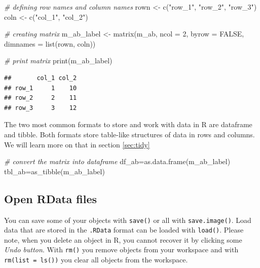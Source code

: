 \documentclass[
  12pt,
  oneside]{book}
\newenvironment{Shaded}{\begin{snugshade}}{\end{snugshade}}
\newcommand{\AttributeTok}[1]{\textcolor[rgb]{0.77,0.63,0.00}{#1}}
\newcommand{\CommentTok}[1]{\textcolor[rgb]{0.56,0.35,0.01}{\textit{#1}}}
\newcommand{\ConstantTok}[1]{\textcolor[rgb]{0.00,0.00,0.00}{#1}}
\newcommand{\DecValTok}[1]{\textcolor[rgb]{0.00,0.00,0.81}{#1}}
\newcommand{\FunctionTok}[1]{\textcolor[rgb]{0.00,0.00,0.00}{#1}}
\newcommand{\NormalTok}[1]{#1}
\newcommand{\OtherTok}[1]{\textcolor[rgb]{0.56,0.35,0.01}{#1}}
\newcommand{\StringTok}[1]{\textcolor[rgb]{0.31,0.60,0.02}{#1}}
\theoremstyle{definition}
\theoremstyle{definition}
\theoremstyle{definition}
\theoremstyle{definition}
\theoremstyle{remark}
\begin{document}
\begin{Shaded}
\begin{Highlighting}[]
\CommentTok{\# defining row names and column names}
\NormalTok{rown }\OtherTok{\textless{}{-}} \FunctionTok{c}\NormalTok{(}\StringTok{"row\_1"}\NormalTok{, }\StringTok{"row\_2"}\NormalTok{, }\StringTok{"row\_3"}\NormalTok{)}
\NormalTok{coln }\OtherTok{\textless{}{-}} \FunctionTok{c}\NormalTok{(}\StringTok{"col\_1"}\NormalTok{, }\StringTok{"col\_2"}\NormalTok{)}

\CommentTok{\# creating matrix}
\NormalTok{m\_ab\_label }\OtherTok{\textless{}{-}} \FunctionTok{matrix}\NormalTok{(m\_ab, }\AttributeTok{ncol =} \DecValTok{2}\NormalTok{, }\AttributeTok{byrow =} \ConstantTok{FALSE}\NormalTok{, }
            \AttributeTok{dimnames =} \FunctionTok{list}\NormalTok{(rown, coln))}
  
\CommentTok{\# print matrix}
\FunctionTok{print}\NormalTok{(m\_ab\_label)}
\end{Highlighting}
\end{Shaded}

\begin{verbatim}
##       col_1 col_2
## row_1     1    10
## row_2     2    11
## row_3     3    12
\end{verbatim}

The two most common formats to store and work with data in R are dataframe and tibble. Both formats store table-like structures of data in rows and columns. We will learn more on that in section \ref{sec:tidy}

\begin{Shaded}
\begin{Highlighting}[]
\CommentTok{\# convert the matrix into dataframe}
\NormalTok{df\_ab}\OtherTok{=}\FunctionTok{as.data.frame}\NormalTok{(m\_ab\_label)}
\NormalTok{tbl\_ab}\OtherTok{=}\FunctionTok{as\_tibble}\NormalTok{(m\_ab\_label)}
\end{Highlighting}
\end{Shaded}

\hypertarget{open-rdata-files}{%
\subsection{Open RData files}\label{open-rdata-files}}

You can save some of your objects with \texttt{save()} or all with \texttt{save.image()}. Load data that are stored in the \texttt{.RData} format can be loaded with \texttt{load()}. Please note, when you delete an object in R, you cannot recover it by clicking some \emph{Undo button}.
With \texttt{rm()} you remove objects from your workspace and with \texttt{rm(list\ =\ ls())} you clear all objects from the workspace.
\end{document}

